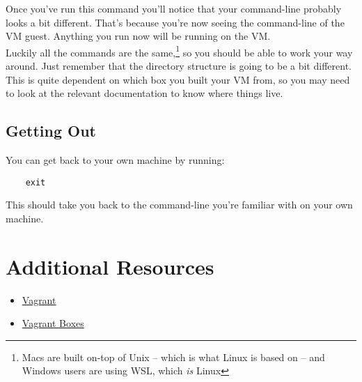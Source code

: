 Once you've run this command you'll notice that your command-line probably looks a bit different. That's because you're now seeing the command-line of the VM guest. Anything you run now will be running on the VM.
\\

Luckily all the commands are the same,\footnote{Macs are built on-top of Unix – which is what Linux is based on – and Windows users are using WSL, which \textit{is} Linux} so you should be able to work your way around. Just remember that the directory structure is going to be a bit different. This is quite dependent on which box you built your VM from, so you may need to look at the relevant documentation to know where things live.

\subsection{Getting Out}

You can get back to your own machine by running:

\begin{verbatim}
    exit
\end{verbatim}

This should take you back to the command-line you're familiar with on your own machine.

\section{Additional Resources}

\begin{itemize}[leftmargin=*]
    \item \href{https://www.vagrantup.com}{Vagrant}
    \item \href{https://app.vagrantup.com/boxes/search}{Vagrant Boxes}
\end{itemize}